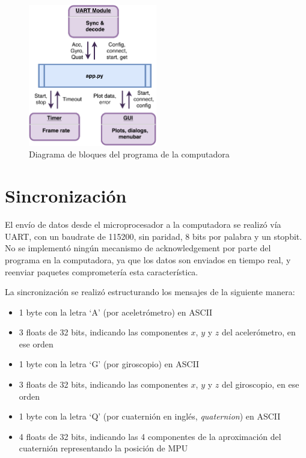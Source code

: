 \documentclass{article}
\begin{document}
\begin{figure}[ht]
	\centering
	\includegraphics[width=0.5\textwidth]{imgs/pyprog.pdf}
	\caption{Diagrama de bloques del programa de la computadora}
	\label{fig:pyprog}
\end{figure}



\section{Sincronizaci\'on}

El env\'io de datos desde el microprocesador a la computadora se realiz\'o v\'ia UART, con un baudrate de 115200, sin paridad, 8 bits por palabra y un stopbit. No se implement\'o ning\'un mecanismo de acknowledgement por parte del programa en la computadora, ya que los datos son enviados en tiempo real, y reenviar paquetes comprometer\'ia esta caracter\'istica.

La sincronizaci\'on se realiz\'o estructurando los mensajes de la siguiente manera:
\begin{itemize}
	\item 1 byte con la letra `A' (por aceletr\'ometro) en ASCII
	\item 3 floats de 32 bits, indicando las componentes $x$, $y$ y $z$ del aceler\'ometro, en ese orden
	\item 1 byte con la letra `G' (por giroscopio) en ASCII
	\item 3 floats de 32 bits, indicando las componentes $x$, $y$ y $z$ del giroscopio, en ese orden
	\item 1 byte con la letra `Q' (por cuaterni\'on en ingl\'es, \textit{quaternion}) en ASCII
	\item 4 floats de 32 bits, indicando las 4 componentes de la aproximaci\'on del cuaterni\'on representando la posici\'on de MPU
\end{itemize}
\end{document}
